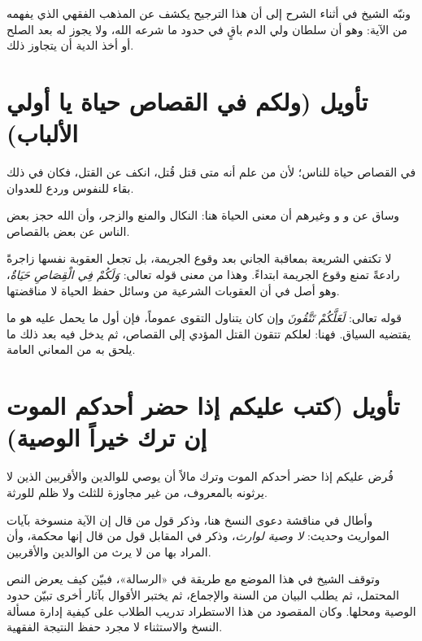 ونبّه الشيخ في أثناء الشرح إلى أن هذا الترجيح يكشف عن المذهب الفقهي الذي يفهمه  من الآية: وهو أن سلطان ولي الدم باقٍ في حدود ما شرعه الله، ولا يجوز له بعد الصلح أو أخذ الدية أن يتجاوز ذلك.

\separator

\section{تأويل (ولكم في القصاص حياة يا أولي الألباب)}
 في القصاص حياة للناس؛ لأن من علم أنه متى قتل قُتل، انكف عن القتل، فكان في ذلك بقاء للنفوس وردع للعدوان.

وساق عن  و و وغيرهم أن معنى الحياة هنا: النكال والمنع والزجر، وأن الله حجز بعض الناس عن بعض بالقصاص.

\begin{fawaid}
لا تكتفي الشريعة بمعاقبة الجاني بعد وقوع الجريمة، بل تجعل العقوبة نفسها زاجرةً رادعةً تمنع وقوع الجريمة ابتداءً. وهذا من معنى قوله تعالى: \textit{وَلَكُمْ فِي الْقِصَاصِ حَيَاةٌ}، وهو أصل في أن العقوبات الشرعية من وسائل حفظ الحياة لا مناقضتها.
\end{fawaid}

\begin{fawaid}
قوله تعالى: \textit{لَعَلَّكُمْ تَتَّقُونَ} وإن كان يتناول التقوى عموماً، فإن أول ما يحمل عليه هو ما يقتضيه السياق. فهنا: لعلكم تتقون القتل المؤدي إلى القصاص، ثم يدخل فيه بعد ذلك ما يلحق به من المعاني العامة.
\end{fawaid}

\separator

\section{تأويل (كتب عليكم إذا حضر أحدكم الموت إن ترك خيراً الوصية)}
 فُرض عليكم إذا حضر أحدكم الموت وترك مالاً أن يوصي للوالدين والأقربين الذين لا يرثونه بالمعروف، من غير مجاوزة للثلث ولا ظلم للورثة.

وأطال  في مناقشة دعوى النسخ هنا، وذكر قول من قال إن الآية منسوخة بآيات المواريث وحديث: \textit{لا وصية لوارث}، وذكر في المقابل قول من قال إنها محكمة، وأن المراد بها من لا يرث من الوالدين والأقربين.

وتوقف الشيخ في هذا الموضع مع طريقة  في «الرسالة»، فبيّن كيف يعرض النص المحتمل، ثم يطلب البيان من السنة والإجماع، ثم يختبر الأقوال بآثار أخرى تبيّن حدود الوصية ومحلها. وكان المقصود من هذا الاستطراد تدريب الطلاب على كيفية إدارة مسألة النسخ والاستثناء لا مجرد حفظ النتيجة الفقهية.


